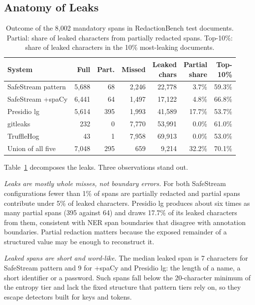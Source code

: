 \documentclass[conference]{IEEEtran}
\begin{document}
\subsection{Anatomy of Leaks}

\begin{table}[t]
\centering
\caption{Outcome of the 8{,}002 mandatory spans in RedactionBench test
documents. Partial: share of leaked characters from partially redacted spans.
Top-10\%: share of leaked characters in the 10\% most-leaking documents.}
\label{tab:outcomes}
\setlength{\tabcolsep}{2.6pt}
\begin{tabular}{lrrrrrr}
\toprule
System & Full & Part. & Missed & \shortstack{Leaked\\chars} & \shortstack{Partial\\share} & \shortstack{Top-\\10\%} \\
\midrule
SafeStream pattern & 5{,}688 & 68  & 2{,}246 & 22{,}778 & 3.7\%  & 59.3\% \\
SafeStream +spaCy  & 6{,}441 & 64  & 1{,}497 & 17{,}122 & 4.8\%  & 66.8\% \\
Presidio lg        & 5{,}614 & 395 & 1{,}993 & 41{,}589 & 17.7\% & 53.7\% \\
gitleaks           & 232     & 0   & 7{,}770 & 53{,}991 & 0.0\%  & 61.0\% \\
TruffleHog         & 43      & 1   & 7{,}958 & 69{,}913 & 0.0\%  & 53.0\% \\
\midrule
Union of all five  & 7{,}048 & 295 & 659     & 9{,}214  & 32.2\% & 70.1\% \\
\bottomrule
\end{tabular}
\end{table}

Table~\ref{tab:outcomes} decomposes the leaks. Three observations stand out.

\emph{Leaks are mostly whole misses, not boundary errors.} For both SafeStream
configurations fewer than 1\% of spans are partially redacted and partial
spans contribute under 5\% of leaked characters. Presidio lg produces about
six times as many partial spans (395 against 64) and draws 17.7\% of its
leaked characters from them, consistent with NER span boundaries that disagree
with annotation boundaries. Partial redaction matters because the exposed
remainder of a structured value may be enough to reconstruct it.

\emph{Leaked spans are short and word-like.} The median leaked span is 7
characters for SafeStream pattern and 9 for +spaCy and Presidio lg: the length
of a name, a short identifier or a password. Such spans fall below the
20-character minimum of the entropy tier and lack the fixed structure that
pattern tiers rely on, so they escape detectors built for keys and tokens.
\end{document}
